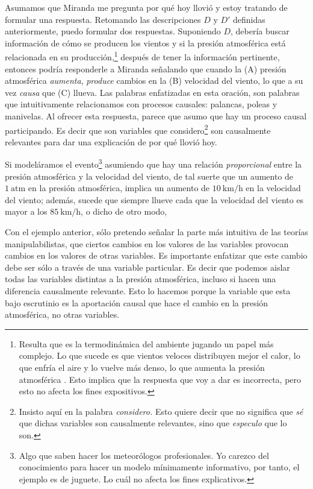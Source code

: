 Asumamos que Miranda me pregunta por qué hoy llovió y estoy
tratando de formular una respuesta. Retomando las
descripciones $ D $ y $ D' $ definidas anteriormente, puedo
formular dos respuestas. Suponiendo $ D $, debería buscar
información de cómo se producen los vientos y si la presión
atmosférica está relacionada en su producción,\footnote{
  Resulta que es la termodinámica del ambiente jugando un
  papel más complejo. Lo que sucede es que vientos veloces
  distribuyen mejor el calor, lo que enfría el aire y lo
  vuelve más denso, lo que aumenta la presión atmosférica
  \parencite{Spiridonov2021}. Esto implica que la respuesta
  que voy a dar es incorrecta, pero esto no afecta los fines
  expositivos. 
}
después de tener la información pertinente, entonces podría
responderle a Miranda señalando que cuando la (A) presión
atmosférica \emph{aumenta}, \emph{produce} cambios en la (B)
velocidad del viento, lo que a su vez \emph{causa} que (C)
llueva. Las palabras enfatizadas en esta oración, son
palabras que intuitivamente relacionamos con procesos
causales: palancas, poleas y manivelas. Al ofrecer esta
respuesta, parece que asumo que hay un proceso causal
participando. Es decir que son variables que
considero\footnote{ 
  Insisto aquí en la palabra \emph{considero.} Esto quiere
  decir que no significa que \emph{sé} que dichas variables
  son causalmente relevantes, sino que \emph{especulo} que
  lo son.
} 
son causalmente	relevantes para dar una explicación de por
qué llovió hoy.

Si modeláramos el evento\footnote{
	Algo que saben hacer los meteorólogos profesionales. Yo
	carezco del conocimiento para hacer un modelo mínimamente
	informativo, por tanto, el ejemplo es de juguete. Lo
	cuál  no afecta los fines explicativos. 
} 
asumiendo que hay una relación \emph{proporcional} entre la
presión atmosférica y la velocidad del viento, de tal suerte
que un aumento de $1~\text{atm}$ en la presión atmosférica,
implica un aumento de $ 10~\text{km/h} $ en la velocidad del
viento; además, sucede que siempre llueve cada que la
velocidad del viento es mayor a los $ 85~\text{km/h} $, o
dicho de otro modo, 

Con el ejemplo anterior, sólo pretendo señalar la parte más
intuitiva de las teorías manipulabilistas, que ciertos
cambios en los valores de las variables provocan cambios en
los valores de otras variables. Es importante enfatizar que
este cambio debe ser sólo a través de una variable
particular. Es decir que podemos aislar todas las variables
distintas a la presión atmosférica, incluso si hacen una
diferencia causalmente relevante. Esto lo hacemos porque la
variable que esta bajo escrutinio es la aportación causal
que hace el cambio en la presión atmosférica, no otras
variables. 

